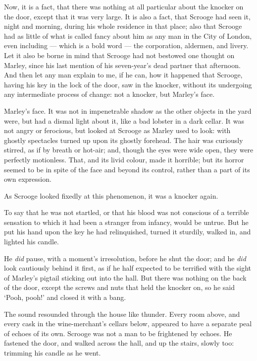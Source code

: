 \documentclass[11pt,twoside]{article}\makeatletter
\begin{document}
Now, it is a fact, that there was nothing at all particular about the knocker on the door, except that it was very large. It is also a fact, that Scrooge had seen it, night and morning, during his whole residence in that place; also that Scrooge had as little of what is called fancy about him as any man in the City of London, even including — which is a bold word — the corporation, aldermen, and livery.  Let it also be borne in mind that Scrooge had not bestowed one thought on Marley, since his last mention of his seven-year's dead partner that afternoon.  And then let any man explain to me, if he can, how it happened that Scrooge, having his key in the lock of the door, saw in the knocker, without its undergoing any intermediate process of change:  not a knocker, but Marley's face. \par
Marley's face.  It was not in impenetrable shadow as the other objects in the yard were, but had a dismal light about it, like a bad lobster in a dark cellar.  It was not angry or ferocious, but looked at Scrooge as Marley used to look: with ghostly spectacles turned up upon its ghostly forehead. The hair was curiously stirred, as if by breath or hot-air; and, though the eyes were wide open, they were perfectly motionless.  That, and its livid colour, made it horrible; but its horror seemed to be in spite of the face and beyond its control, rather than a part of its own expression.  \par
As Scrooge looked fixedly at this phenomenon, it was a knocker again.  \par
To say that he was not startled, or that his blood was not conscious of a terrible sensation to which it had been a stranger from infancy, would be untrue.  But he put his hand upon the key he had relinquished, turned it sturdily, walked in, and lighted his candle.  \par
He \textit{did} pause, with a moment's irresolution, before he shut the door; and he \textit{did} look cautiously behind it first, as if he half expected to be terrified with the sight of Marley's pigtail sticking out into the hall.  But there was nothing on the back of the door, except the screws and nuts that held the knocker on, so he said ‘Pooh, pooh!’ and closed it with a bang.  \par
The sound resounded through the house like thunder. Every room above, and every cask in the wine-merchant's cellars below, appeared to have a separate peal of echoes of its own.  Scrooge was not a man to be frightened by echoes. He fastened the door, and walked across the hall, and up the stairs, slowly too: trimming his candle as he went.  \par
\end{document}
